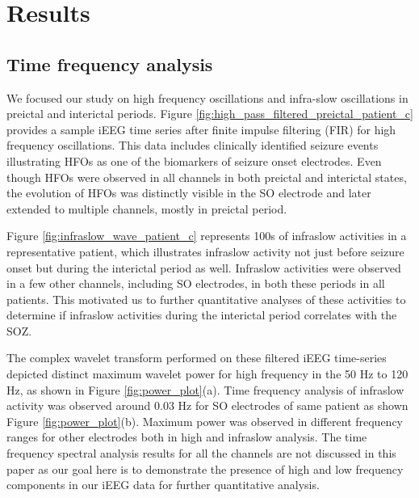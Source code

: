 \section{Results}
\label{sec:results}

\subsection{Time frequency analysis}
We focused our study on high frequency oscillations and infra-slow oscillations in preictal and interictal periods. Figure \ref{fig:high_pass_filtered_preictal_patient_c} provides a sample iEEG time series after finite impulse filtering (FIR) for high frequency oscillations. This data includes clinically identified seizure events illustrating HFOs as one of the biomarkers of seizure onset electrodes. Even though HFOs were observed in all channels in both preictal and interictal states, the evolution of HFOs was distinctly visible in the SO electrode and later extended to multiple channels, mostly in preictal period.

Figure \ref{fig:infraslow_wave_patient_c} represents 100s of infraslow activities in a representative patient, which illustrates infraslow activity not just before seizure onset but during the interictal period as well. Infraslow activities were observed in a few other channels, including SO electrodes, in both these periods in all patients. This motivated us to further quantitative analyses of these activities to determine if infraslow activities during the interictal period correlates with the SOZ.

The complex wavelet transform performed on these filtered iEEG time-series depicted distinct maximum wavelet power for high frequency in the 50 Hz to 120 Hz, as shown in Figure \ref{fig:power_plot}(a). Time frequency analysis of infraslow activity was observed around 0.03 Hz for SO electrodes of same patient as shown Figure \ref{fig:power_plot}(b). Maximum power was observed in different frequency ranges for other electrodes both in high and infraslow analysis. The time frequency spectral analysis results for all the channels are not discussed in this paper as our goal here is to demonstrate the presence of high and low frequency components in our iEEG data for further quantitative analysis.


